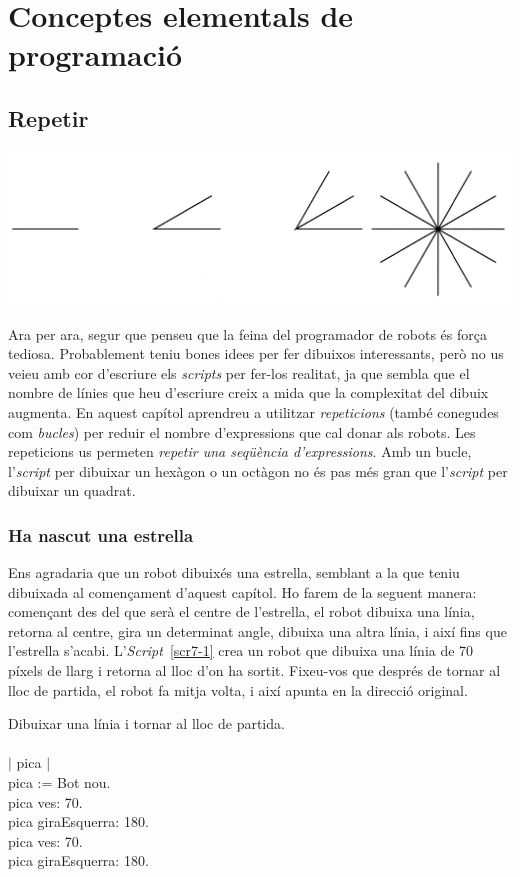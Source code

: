 \part{Conceptes elementals de programació}


\chapter{Repetir}
\label{cap7}

\includegraphics[scale=0.135]{Imatges/figura7-0.jpg}

Ara per ara, segur que penseu que la feina del programador de robots és força tediosa. Probablement teniu bones idees per fer dibuixos interessants, però no us veieu amb cor  d'escriure els \emph{scripts} per fer-los realitat, ja que sembla que el nombre de línies que heu d'escriure creix a mida que la complexitat del dibuix augmenta. En aquest capítol aprendreu a utilitzar \emph{repeticions} (també conegudes com \emph{bucles}) per reduir el nombre d'expressions que cal donar als robots. Les repeticions us permeten \emph{repetir una seqüència d'expressions}. Amb un bucle, l'\emph{script} per dibuixar un hexàgon o un octàgon no és pas més gran que l'\emph{script} per dibuixar un quadrat.

\section{Ha nascut una estrella}
Ens agradaria que un robot dibuixés una estrella, semblant a la que teniu dibuixada al començament d'aquest capítol. Ho farem de la seguent manera: començant des del que serà el centre de l'estrella, el robot dibuixa una línia, retorna al centre, gira un determinat angle, dibuixa una altra línia, i així fins que l'estrella s'acabi. L'\emph{Script}~\ref{scr7-1} crea un robot que dibuixa una línia de 70 píxels de llarg i retorna al lloc d'on ha sortit. Fixeu-vos que  després de tornar al lloc de partida, el robot fa mitja volta, i així apunta en la direcció original.
\begin{script}  Dibuixar una línia i tornar al lloc de partida.
\textsf{\upshape
\\
\\$|$ pica $|$\\
pica := Bot nou.\\
pica ves: 70.\\
pica giraEsquerra: 180.\\
pica ves: 70.\\
pica giraEsquerra: 180.\\
}
\label{scr7-1}
\end{script}

